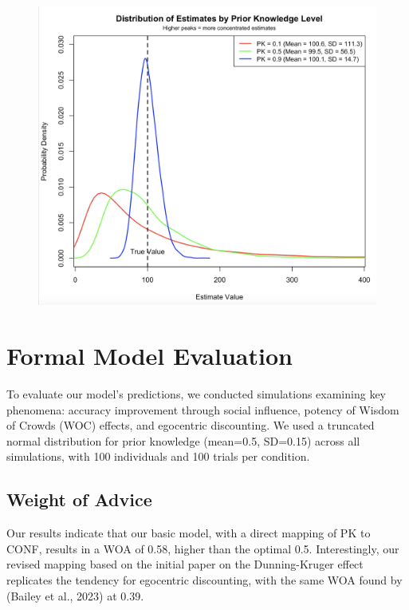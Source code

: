\documentclass[
  man,floatsintext]{apa6}
\begin{document}
\begin{figure}[H]
\includegraphics[width=4.56in]{photos/pk_estimate} \caption{ }\label{fig:unnamed-chunk-4}
\end{figure}

\hypertarget{formal-model-evaluation}{%
\section{Formal Model Evaluation}\label{formal-model-evaluation}}

To evaluate our model's predictions, we conducted simulations examining key phenomena: accuracy improvement through social influence, potency of Wisdom of Crowds (WOC) effects, and egocentric discounting. We used a truncated normal distribution for prior knowledge (mean=0.5, SD=0.15) across all simulations, with 100 individuals and 100 trials per condition.

\hypertarget{weight-of-advice-1}{%
\subsection{Weight of Advice}\label{weight-of-advice-1}}

Our results indicate that our basic model, with a direct mapping of PK to CONF, results in a WOA of 0.58, higher than the optimal 0.5. Interestingly, our revised mapping based on the initial paper on the Dunning-Kruger effect replicates the tendency for egocentric discounting, with the same WOA found by (Bailey et al., 2023) at 0.39.
\end{document}
